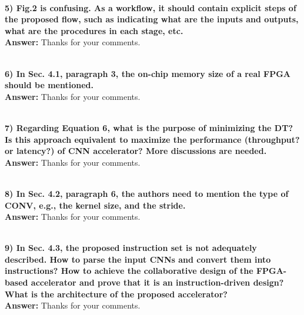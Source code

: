 \documentclass[12pt]{paper}
\newcommand{\rev}[1]{{{\color[rgb]{0,0,1}{#1}}}}
\newcommand{\answer}[1]{\noindent\textbf{Answer:} #1}
\newcommand{\comment}[1]{\noindent\textbf{\\ #1}\\}
\begin{document}
\comment{5) Fig.2 is confusing. As a workflow, it should contain explicit steps of the proposed flow, such as indicating what are the inputs and outputs, what are the procedures in each stage, etc. 
}
\answer{Thanks for your comments.}
\rev{We have corrected this error.}

\comment{6) In Sec. 4.1, paragraph 3, the on-chip memory size of a real FPGA should be mentioned. 
}
\answer{Thanks for your comments.}
\rev{We have corrected this error.}

\comment{7) Regarding Equation 6, what is the purpose of minimizing the DT?  Is this approach equivalent to maximize the performance (throughput? or latency?) of CNN accelerator? More discussions are needed. 
}
\answer{Thanks for your comments.}
\rev{We have corrected this error.}

\comment{8) In Sec. 4.2, paragraph 6, the authors need to mention the type of CONV, e.g., the kernel size, and the stride. 
}
\answer{Thanks for your comments.}
\rev{We have corrected this error.}

\comment{9) In Sec. 4.3, the proposed instruction set is not adequately described. How to parse the input CNNs and convert them into instructions?  How to achieve the collaborative design of the FPGA-based accelerator and prove that it is an instruction-driven design? What is the architecture of the proposed accelerator?
}
\answer{Thanks for your comments.}
\rev{We have corrected this error.}
\end{document}
